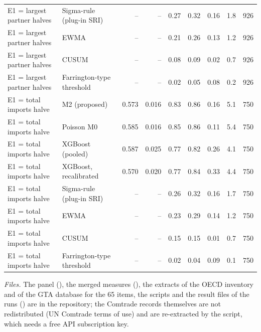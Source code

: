 \begin{minipage}{\linewidth}
\begin{tabular}{llrrrrrrr}
E1 = largest partner halves & Sigma-rule (plug-in SRI) & -- & -- & 0.27 & 0.32 & 0.16 & 1.8 & 926 \\
E1 = largest partner halves & EWMA & -- & -- & 0.21 & 0.26 & 0.13 & 1.2 & 926 \\
E1 = largest partner halves & CUSUM & -- & -- & 0.08 & 0.09 & 0.02 & 0.7 & 926 \\
E1 = largest partner halves & Farrington-type threshold & -- & -- & 0.02 & 0.05 & 0.08 & 0.2 & 926 \\
E1 = total imports halve & M2 (proposed) & 0.573 & 0.016 & 0.83 & 0.86 & 0.16 & 5.1 & 750 \\
E1 = total imports halve & Poisson M0 & 0.585 & 0.016 & 0.85 & 0.86 & 0.11 & 5.4 & 750 \\
E1 = total imports halve & XGBoost (pooled) & 0.587 & 0.025 & 0.77 & 0.82 & 0.26 & 4.1 & 750 \\
E1 = total imports halve & XGBoost, recalibrated & 0.570 & 0.020 & 0.77 & 0.84 & 0.33 & 4.4 & 750 \\
E1 = total imports halve & Sigma-rule (plug-in SRI) & -- & -- & 0.26 & 0.32 & 0.16 & 1.7 & 750 \\
E1 = total imports halve & EWMA & -- & -- & 0.23 & 0.29 & 0.14 & 1.2 & 750 \\
E1 = total imports halve & CUSUM & -- & -- & 0.15 & 0.15 & 0.01 & 0.7 & 750 \\
E1 = total imports halve & Farrington-type threshold & -- & -- & 0.02 & 0.04 & 0.09 & 0.1 & 750 \\
\bottomrule
\end{tabular}
\end{minipage}
\vspace{14pt}

\textit{Files.} The panel (), the merged measures (), the extracts of the OECD inventory and of the GTA database for the 65 items, the scripts and the result files of the runs () are in the repository; the Comtrade records themselves are not redistributed (UN Comtrade terms of use) and are re-extracted by the script, which needs a free API subscription key.
